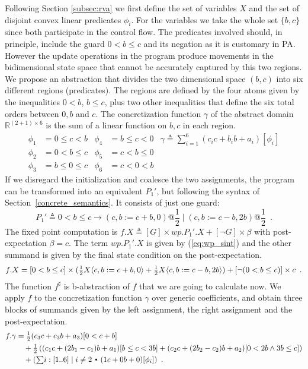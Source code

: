 \documentclass{eptcs}
\theoremstyle{plain}
\theoremstyle{definition}
\newcommand{\Real}{\ensuremath{\mathbb R}}
\newcommand{\lit}[1]{\ensuremath{\mathit{#1}}}
\newcommand{\Prg}{P}
\newcommand{\Def}{\ensuremath{\triangleq}}
\newcommand{\Subst}[2][]
	{ \ensuremath{\ifthenelse{\equal{#1}{}}{\langle #2 \rangle}{\langle #1\mapsto #2 \rangle} }}
\newcommand{\ra}{\ensuremath{\rightarrow}}
\newcommand{\dotsep}{\mbox{\raisebox{0.4ex}{\tiny\ensuremath{\:\;\bullet\;\:}}}}
\newcommand{\Not}{\ensuremath{\neg}}
\newcommand{\Wp}{\lit{wp}}
\begin{document}
Following Section \ref{subsec:rva} we first define the set of variables $X$ and the set of disjoint convex linear predicates $\phi_i$.
For the variables we take the whole set $\{b,c\}$ since both participate in the control flow.
The predicates involved should, in principle, include the guard $0<b\leq c$ and its negation as it is customary in PA.
However the update operations in the program produce movements in the bidimensional state space that cannot be accurately captured by this two regions.
We propose an abstraction that divides the two dimensional space $(b,c)$ into six different regions (predicates).
The regions are defined by the four atoms given by the inequalities $0<b$, $b\leq c$, plus two other inequalities that define the six total orders between $0,b$ and $c$.
The concretization function $\gamma$ of the abstract domain $\Real^{(2+1)\times 6}$ is the sum of a linear function on $b,c$ in each region.
\begin{align*}
\phi_1 &= 0 \leq c < b  &  \phi_4 &= b \leq c < 0 & \gamma \Def \textstyle \sum_{i=1}^{6} (c_i c + b_i b + a_i) [\phi_i] \\
\phi_2 &= 0 < b \leq c  &  \phi_5 &= c < b \leq 0 \\
\phi_3 &= b \leq 0 \leq c  &  \phi_6 &= c < 0 < b
\end{align*}
If we disregard the initialization and coalesce the two assignments, the program can be transformed into an equivalent $\Prg_1'$, but following the syntax of Section~\ref{concrete_semantics}.
It consists of just one guard:
\[ \Prg_1' \Def 0<b\leq c \ra (c,b:=c+b,0)@\textstyle{\frac{1}{2}} \mid (c,b:=c-b,2b)@\textstyle{\frac{1}{2}}\enspace. \]
The fixed point computation is $f.X \Def [G]\times\Wp.\Prg_1'.X + [\Not G]\times\beta$ with \mbox{post-expectation} $\beta=c$.
The term $\Wp.\Prg_1'.X$ is given by (\ref{eq:wp_sint}) and the other summand is given by the final state condition on the \mbox{post-expectation}.
\[ f.X = [0<b\leq c] \times (\tfrac{1}{2} X\Subst{c,b:=c+b,0} + \tfrac{1}{2}
X\Subst{c,b:=c-b,2b}) +  [\Not(0<b\leq c)]\times c \enspace. \]
The function $f^\sharp$ is b-abstraction of $f$ that we are going to calculate now.
We apply $f$ to the concretization function $\gamma$ over generic coefficients, and obtain three blocks of summands given by the left assignment, the right assignment and the \mbox{post-expectation}.
\begin{align*}
	f.\gamma &= \tfrac{1}{2}(c_3 c + c_3 b + a_3)[0<c+b] \\
	&\quad {}+ \tfrac{1}{2}\left( (c_1 c+(2b_1-c_1)b+a_1)[b\leq c<3b] + (c_2 c+(2b_2-c_2)b+a_2)[0<2b \land 3b\leq c] \right) \\
	&\quad {}+ (\textstyle{\sum} i:[1..6] \mid i\neq 2 \dotsep (1c+0b+0) [\phi_i])\enspace.
\end{align*}
\end{document}
